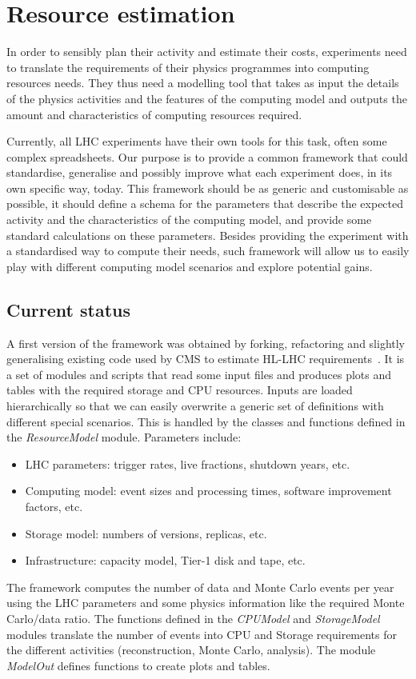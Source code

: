 \section{Resource estimation}
In order to sensibly plan their activity and estimate their costs,
experiments need to translate the requirements of their physics
programmes into computing resources needs. They thus need a modelling
tool that takes as input the details of the physics activities and the
features of the computing model and outputs the amount
and characteristics
of computing resources required.

Currently, all LHC experiments have their own tools for this task,
often some complex spreadsheets. Our purpose is to provide a common
framework that could standardise, generalise and possibly improve what
each experiment does, in its own specific way, today. This framework
should be as generic and customisable as possible, it should define a
schema for the parameters that describe the expected activity and the
characteristics of the computing model, and provide some standard
calculations on these parameters.  Besides providing the experiment
with a standardised way to compute their needs, such framework will
allow us to easily play with different computing model scenarios and
explore potential gains.

\subsection{Current status}
A first version of the framework \cite{ourresmodel} was obtained by
forking, refactoring and slightly generalising existing code used by
CMS to estimate HL-LHC requirements~\cite{cmsresmodel}. It is a set of
modules and scripts that read some input files and produces plots and
tables with the required storage and CPU resources. Inputs are loaded
hierarchically so that we can easily overwrite a generic set of
definitions with different special scenarios. This is handled by the
classes and functions defined in the {\it ResourceModel}
module. Parameters include:
\begin{itemize}
\item LHC parameters: trigger rates, live fractions, shutdown years, etc.
\item Computing model: event sizes and processing times, software improvement factors, etc.
\item Storage model: numbers of versions, replicas, etc.
\item Infrastructure: capacity model, Tier-1 disk and tape, etc.
\end{itemize}
The framework computes the number of data and Monte Carlo events per
year using the LHC parameters and some physics information like the
required Monte Carlo/data ratio. The functions defined in the {\it
  CPUModel} and {\it StorageModel} modules translate the number of
events into CPU and Storage requirements for the different activities
(reconstruction, Monte Carlo, analysis).  The module {\it ModelOut}
defines functions to create plots and tables.

